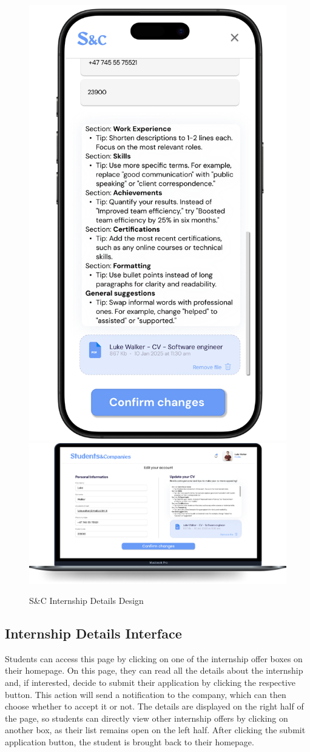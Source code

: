 \begin{figure}[H]
    \centering
    \includegraphics[width=0.2\linewidth]{Images/Mock-up/EditProfileMobile.png}
    \includegraphics[width=0.75\linewidth]{Images/Mock-up/EditProfilePC.png}
    \caption{S\&C Internship Details Design}
    \label{fig:homepage-design}
\end{figure}

\subsection{Internship Details Interface}
Students can access this page by clicking on one of the internship offer boxes on their homepage. On this page, they can read all the details about the internship and, if interested, decide to submit their application by clicking the respective button. This action will send a notification to the company, which can then choose whether to accept it or not. The details are displayed on the right half of the page, so students can directly view other internship offers by clicking on another box, as their list remains open on the left half. After clicking the submit application button, the student is brought back to their homepage. \\


